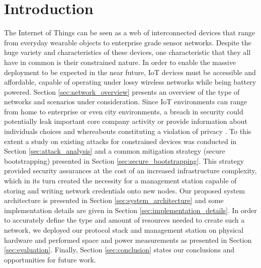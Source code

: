 \documentclass{sig-alternate-05-2015}
\begin{document}
\section{Introduction}
The Internet of Things can be seen as a web of interconnected devices that range from everyday wearable objects to enterprise grade sensor networks. Despite the huge variety and characteristics of these devices, one characteristic that they all have in common is their constrained nature. In order to enable the massive deployment to be expected in the near future, \gls{IoT} devices must be accessible and affordable, capable of operating under lossy wireless networks while being battery powered. Section \ref{sec:network_overview} presents an overview of the type of networks and scenarios under consideration. Since \gls{IoT} environments can range from home to enterprise or even city environments, a breach in security could potentially leak important core company activity or provide information about individuals choices and whereabouts constituting a violation of privacy \cite{Ukil2015}. To this extent a study on existing attacks for constrained devices was conducted in Section \ref{sec:attack_analysis} and a common mitigation strategy (secure bootstrapping) presented in Section \ref{sec:secure_bootstrapping}. This strategy provided security assurances at the cost of an increased infrastructure complexity, which in its turn created the necessity for a management station capable of storing and writing network credentials onto new nodes. Our proposed system architecture is presented in Section \ref{sec:system_architecture} and some implementation details are given in Section \ref{sec:implementation_details}. In order to accurately define the type and amount of resources needed to create such a network, we deployed our protocol stack and management station on physical hardware and performed space and power measurements as presented in Section \ref{sec:evaluation}. Finally, Section \ref{sec:conclusion} states our conclusions and opportunities for future work.
\end{document}
